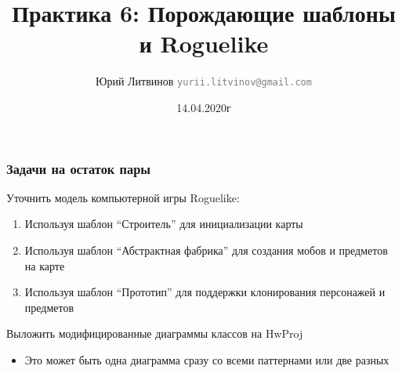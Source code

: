 \documentclass[xetex,mathserif,serif]{beamer}
\title{Практика 6: Порождающие шаблоны и Roguelike}
\author[Юрий Литвинов]{Юрий Литвинов \newline \textcolor{gray}{\small\texttt{yurii.litvinov@gmail.com}}}
\date{14.04.2020г}
\begin{document}
	
	\frame{\titlepage}

	\begin{frame}
		\frametitle{Задачи на остаток пары}
		Уточнить модель компьютерной игры Roguelike:

		\begin{enumerate}
			\item Используя шаблон ``Строитель'' для инициализации карты
			\item Используя шаблон ``Абстрактная фабрика'' для создания мобов и предметов на карте
			\item Используя шаблон ``Прототип'' для поддержки клонирования персонажей и предметов
		\end{enumerate}

		Выложить модифицированные диаграммы классов на HwProj

		\begin{itemize}
			\item Это может быть одна диаграмма сразу со всеми паттернами или две разных
		\end{itemize}
	\end{frame}
\end{document}

